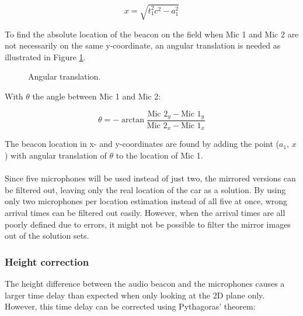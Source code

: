 \documentclass[final]{scrreprt} %
\begin{document}
\begin{equation}
	x = \sqrt{t_1^2 c^2 - a_1^2}
\end{equation}

To find the absolute location of the beacon on the field when Mic 1 and Mic 2 are not necessarily on the same y-coordinate, an angular translation is needed as illustrated in Figure \ref{fig:angular-translation}.

\begin{figure} [H]
\centering
	\caption{Angular translation.}
	\label{fig:angular-translation}
\end{figure}

With $\theta$ the angle between Mic 1 and Mic 2:

\begin{equation}
	\theta = -\arctan{\frac{\text{Mic 2}_y - \text{Mic 1}_y}{\text{Mic 2}_x - \text{Mic 1}_x}}
\end{equation}

The beacon location in x- and y-coordinates are found by adding the point ($a_1$, $x$) with angular translation of $\theta$ to the location of Mic 1.
\\ \\
Since five microphones will be used instead of just two, the mirrored versions can be filtered out, leaving only the real location of the car as a solution.
By using only two microphones per location estimation instead of all five at once, wrong arrival times can be filtered out easily.
However, when the arrival times are all poorly defined due to errors, it might not be possible to filter the mirror images out of the solution sets.

\subsubsection*{Height correction}
The height difference between the audio beacon and the microphones causes a larger time delay than expected when only looking at the 2D plane only.
However, this time delay can be corrected using Pythagoras' theorem:
\end{document}
